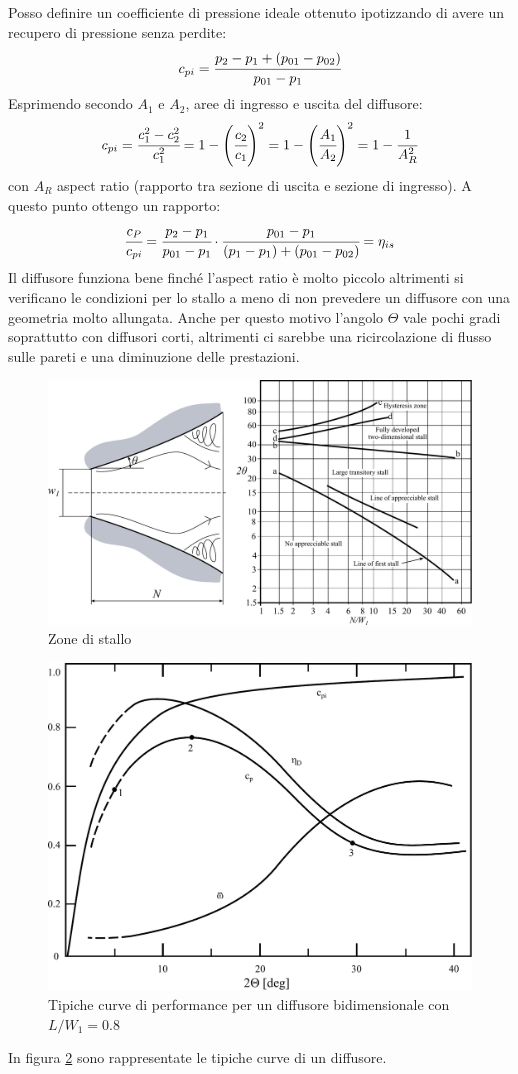 Posso definire un coefficiente di pressione ideale ottenuto ipotizzando di avere un recupero di pressione senza perdite:
\begin{align*}
c_{pi} = \cfrac{p_2 - p_1 + (p_{01} - p_{02})}{p_{01} - p_1}
\end{align*}
Esprimendo secondo $A_1$ e $A_2$, aree di ingresso e uscita del diffusore:
\begin{align*}
c_{pi} = \cfrac{c_1^2 - c_2^2}{c_1^2} = 1 - \left( \cfrac{c_2}{c_1}\right)^2 = 1- \left(\cfrac{A_1}{A_2} \right)^2 =1-\cfrac{1}{A_R^2}
\end{align*}
con $A_R$ aspect ratio (rapporto tra sezione di uscita e sezione di ingresso). A questo punto ottengo un rapporto:
\begin{align*}
\cfrac{c_P}{c_{pi}} = \cfrac{p_2-p_1}{p_{01}-p_1} \cdot \cfrac{p_{01}-p_1}{(p_1-p_1)+(p_{01}-p_{02})}= \eta_{is}
\end{align*}
Il diffusore funziona bene finché l'aspect ratio è molto piccolo altrimenti si verificano le condizioni per lo stallo a meno di non prevedere un diffusore con una geometria molto allungata. Anche per questo motivo l'angolo $\Theta$ vale pochi gradi soprattutto con diffusori corti, altrimenti ci sarebbe una ricircolazione di flusso sulle pareti e una diminuzione delle prestazioni. 
\begin{figure}
\centering
  \includegraphics[width=.7\textwidth]{fig/stallo.pdf}
\caption{Zone di stallo}
\label{fig:stallo}
\end{figure}
\begin{figure}
\centering
  \includegraphics[width=.5\textwidth]{fig/DiffPerf.pdf}
\caption{Tipiche curve di performance per un diffusore bidimensionale con $L/W_1 = 0.8$}
\label{fig:DiffPerf}
\end{figure}
In figura \ref{fig:DiffPerf} sono rappresentate le tipiche curve di un diffusore.
